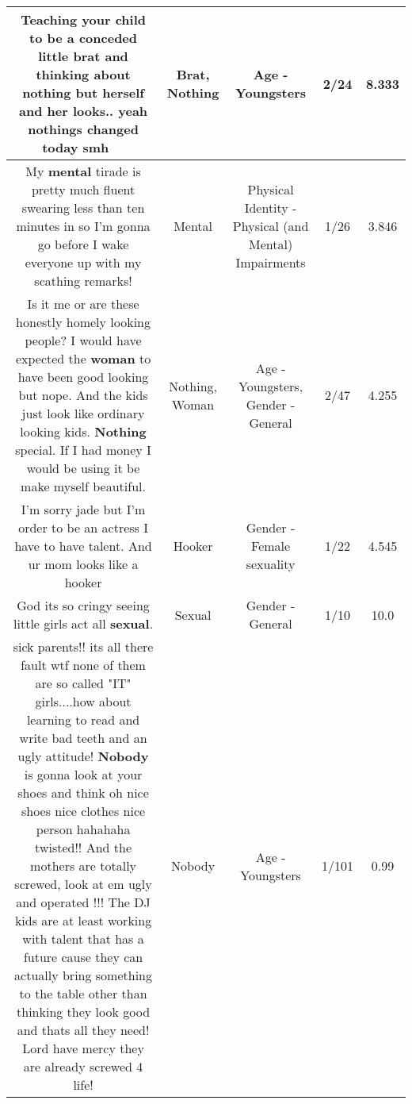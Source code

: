 \documentclass[11pt]{article}
\newlength\mylength
\begin{document}
\begin{center}
\begin{longtable}{|C{.65\mylength}|C{.30\mylength}|C{.12\mylength}|C{.12\mylength}|C{.12\mylength}|}
  \small Teaching your child to be a conceded little \textbf{brat} and thinking about \textbf{nothing} but herself and her looks.. yeah nothings changed today smh 🤦🏻‍♀️\normalsize   & Brat, Nothing & Age - Youngsters & 2/24 & 8.333 \\  \hline
  \small My \textbf{mental} tirade is pretty much fluent swearing less than ten minutes in so I'm gonna go before I wake everyone up with my scathing remarks!\normalsize   & Mental & Physical Identity - Physical (and Mental) Impairments & 1/26 & 3.846 \\  \hline
  \small Is it me or are these honestly homely looking people? I would have expected the \textbf{woman} to have been good looking but nope. And the kids just look like ordinary looking kids. \textbf{Nothing} special. If I had money I would be using it be make myself beautiful.\normalsize   & Nothing, Woman & Age - Youngsters, Gender - General & 2/47 & 4.255 \\  \hline
  \small I'm sorry jade but I'm order to be an actress I have to have talent. And ur mom looks like a hooker\normalsize   & Hooker & Gender - Female sexuality & 1/22 & 4.545 \\  \hline
  \small God its so cringy seeing little girls act all \textbf{sexual}.\normalsize   & Sexual & Gender - General & 1/10 & 10.0 \\  \hline
  \small sick parents!! its all there fault wtf none of them are so called "IT" girls....how about learning to read and write    bad teeth and an ugly attitude! \textbf{Nobody} is gonna look at your shoes and think oh nice shoes nice clothes nice person hahahaha twisted!! And the mothers are totally screwed, look at em ugly and operated !!! The DJ kids are at least working with talent that has a future cause they can actually bring something to the table other than thinking they look good and thats all they need! Lord have mercy they are already screwed 4 life!\normalsize   & Nobody & Age - Youngsters & 1/101 & 0.99 \\  \hline

\end{longtable}
\end{center}
\end{document}
